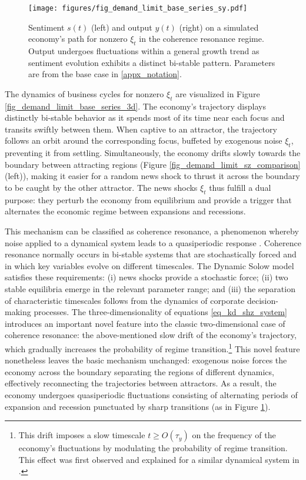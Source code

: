 \documentclass[authoryear, review]{elsarticle}
\begin{document}
\begin{figure}[htb!]
	\centering
	\texttt{[image: figures/fig\_demand\_limit\_base\_series\_sy.pdf]}
	\caption{Sentiment $s(t)$ (left) and output $y(t)$ (right) on a simulated economy's path for nonzero $\xi_t$ in the coherence resonance regime. Output undergoes fluctuations within a general growth trend as sentiment evolution exhibits a distinct bi-stable pattern. Parameters are from the base case in \ref{appx_notation}.}
	\label{fig_demand_limit_base_series_sy}
\end{figure}

The dynamics of business cycles for nonzero $\xi_t$ are visualized in Figure \ref{fig_demand_limit_base_series_3d}. The economy's trajectory displays distinctly bi-stable behavior as it spends most of its time near each focus and transits swiftly between them. When captive to an attractor, the trajectory follows an orbit around the corresponding focus, buffeted by exogenous noise $\xi_t$, preventing it from settling. Simultaneously, the economy drifts slowly towards the boundary between attracting regions (Figure \ref{fig_demand_limit_sz_comparison}(left)),
 making it easier for a random news shock to thrust it across the boundary to be caught by the other attractor. The news shocks $\xi_t$ thus fulfill a dual purpose: they perturb the economy from equilibrium and provide a trigger that alternates the economic regime between expansions and recessions.  

This mechanism can be classified as coherence resonance, a phenomenon whereby noise applied to a dynamical system leads to a quasiperiodic response \citep{PikovskyKurths1997}. Coherence resonance normally occurs in bi-stable systems that are stochastically forced and in which key variables evolve on different timescales. The Dynamic Solow model satisfies these requirements: (i) news shocks provide a stochastic force; (ii) two stable equilibria emerge in the relevant parameter range; and (iii) the separation of characteristic timescales follows from the dynamics of corporate decision-making processes. The three-dimensionality of equations \eqref{eq_kd_shz_system} introduces an important novel feature into the classic two-dimensional case of coherence resonance: the above-mentioned slow drift of the economy's trajectory, which gradually increases the probability of regime transition.\footnote{
	This drift imposes a slow timescale $t\geq O(\tau_y)$ on the frequency of the economy's fluctuations by modulating the probability of regime transition. This effect was first observed and explained for a similar dynamical system in \citet{KroujilineEtAl2019}.
} This novel feature nonetheless leaves the basic mechanism unchanged: exogenous noise forces the economy across the boundary separating the regions of different dynamics, effectively reconnecting the trajectories between attractors. As a result, the economy undergoes quasiperiodic fluctuations consisting of alternating periods of expansion and recession punctuated by sharp transitions (as in Figure \ref{fig_demand_limit_base_series_sy}).
\end{document}
